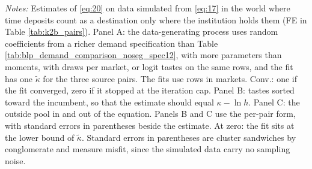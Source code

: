 \begin{table}[H]
\begin{threeparttable}
\begin{tablenotes}[flushleft]
			\item \footnotesize \textit{Notes:} Estimates of \eqref{eq:20} on data simulated from \eqref{eq:17} in the world where time deposits count as a destination only where the institution holds them (FE in Table \ref{tab:k2b_pairs}). Panel A: the data-generating process uses random coefficients from a richer demand specification than Table \ref{tab:blp_demand_comparison_noseg_spec12}, with more parameters than moments, with  draws per market, or logit tastes on the same rows, and the fit has one $\tilde{\kappa}$ for the three source pairs. The fits use  rows in  markets. Conv.: one if the fit converged, zero if it stopped at the iteration cap. Panel B: tastes sorted toward the incumbent, so that the estimate should equal $\kappa-\ln h$. Panel C: the outside pool in and out of the equation. Panels B and C use the per-pair form, with standard errors in parentheses beside the estimate. At zero: the fit sits at the lower bound of $\tilde{\kappa}$. Standard errors in parentheses are cluster sandwiches by conglomerate and measure misfit, since the simulated data carry no sampling noise.
		\end{tablenotes}
	\end{threeparttable}
\end{table}



